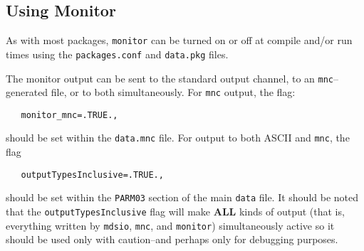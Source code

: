 \subsection{Using Monitor}
\label{sec:pkg:monitor:using}

As with most packages, \texttt{monitor} can be turned on or off at
compile and/or run times using the \texttt{packages.conf} and
\texttt{data.pkg} files.  

The monitor output can be sent to the standard output channel, to an
\texttt{mnc}--generated file, or to both simultaneously.  For
\texttt{mnc} output, the flag:
\begin{verbatim}
   monitor_mnc=.TRUE.,
\end{verbatim}
should be set within the \texttt{data.mnc} file.  For output to both
ASCII and \texttt{mnc}, the flag
\begin{verbatim}
   outputTypesInclusive=.TRUE.,
\end{verbatim}
should be set within the \texttt{PARM03} section of the main
\texttt{data} file.  It should be noted that the
\texttt{outputTypesInclusive} flag will make \textbf{ALL} kinds of
output (that is, everything written by \texttt{mdsio}, \texttt{mnc},
and \texttt{monitor}) simultaneously active so it should be used only
with caution--and perhaps only for debugging purposes.

